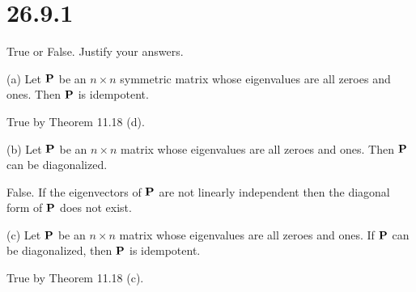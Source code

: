 \section*{26.9.1}
True or False. Justify your answers.

\bigskip
\noindent
(a) Let $\bf P$ be an $n\times n$ symmetric matrix whose eigenvalues
are all zeroes and ones. Then $\bf P$ is idempotent.

\bigskip
\noindent
True by Theorem 11.18 (d).

\bigskip
\noindent
(b) Let $\bf P$ be an $n\times n$ matrix whose eigenvalues are
all zeroes and ones. Then $\bf P$ can be diagonalized.

\bigskip
\noindent
False.
If the eigenvectors of $\bf P$ are not linearly independent
then the diagonal form of $\bf P$ does not exist.

\bigskip
\noindent
(c) Let $\bf P$ be an $n\times n$ matrix whose eigenvalues are all
zeroes and ones. If $\bf P$ can be diagonalized, then $\bf P$ is
idempotent.

\bigskip
\noindent
True by Theorem 11.18 (c).



